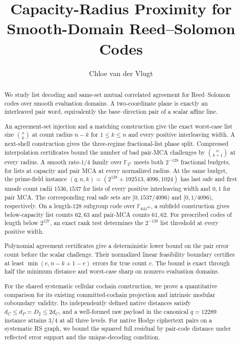 \documentclass[11pt]{article}
\title{Capacity-Radius Proximity for Smooth-Domain Reed--Solomon Codes}
\author{Chloe van der Vlugt}
\date{}
\begin{document}
\maketitle

\begin{abstract}
We study list decoding and same-set mutual correlated agreement for
Reed--Solomon codes over smooth evaluation domains. A two-coordinate plane
is exactly an interleaved pair word, equivalently the base--direction pair
of a scalar affine line.

An agreement-set injection and a matching construction give the exact
worst-case list size \(\binom nk\) at count radius \(n-k\) for
\(1\le k\le n\) and every positive interleaving width. A next-shell
construction gives the three-regime fractional-list phase split.
Compressed interpolation certificates bound the number of bad pair-MCA
challenges by \(\binom n{k+1}\) at every radius. A smooth rate-\(1/4\) family
over \(\mathbb F_{3^n}\) meets both \(2^{-128}\) fractional budgets, for lists
at capacity and pair MCA at every normalized radius.
At the same budget, the prime-field instance
\((q,n,k)=(2^{128}+192513,4096,1024)\) has last safe and first unsafe
count radii \(1536,1537\) for lists of every positive interleaving width
and \(0,1\) for pair MCA. The corresponding real safe sets are
\([0,1537/4096)\) and \([0,1/4096)\), respectively.
On a length-\(128\) subgroup code over \(\mathbb F_{641^{26}}\), a subfield
construction gives below-capacity list counts \(62,63\) and pair-MCA
counts \(61,62\).
For prescribed codes of length below \(2^{127}\), an exact rank test
determines the \(2^{-128}\) list threshold at every positive width.

Polynomial agreement certificates give a deterministic lower bound on the
pair error count before the scalar challenge. Their normalized linear
feasibility boundary certifies at least \(\min(e,n-k+1-e)\) errors for true
count \(e\). The bound is exact through half the minimum distance and
worst-case sharp on nonzero evaluation domains.

For the shared systematic cellular cochain construction, we prove a
quantitative comparison for its existing committed-cochain projection and
intrinsic modular coboundary validity.
Its independently defined native distances satisfy
\(d_C\le d_P=D_2\le2d_C\), and a well-formed raw payload in the canonical
\(q=12289\) instance attains \(3/4\) at all three levels.
For native Hodge ciphertext pairs on a systematic RS graph, we bound the
squared full residual by pair-code distance under reflected error support
and the unique-decoding condition.
\end{abstract}

\tableofcontents












\clearpage

{\small\raggedright}
\end{document}
